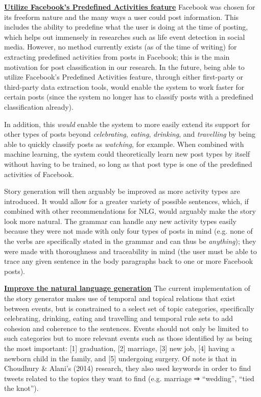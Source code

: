 \underline{\textbf{Utilize Facebook's Predefined Activities feature}}
Facebook was chosen for its freeform nature and the many ways a user could post information. This includes the ability to predefine what the user is doing at the time of posting, which helps out immensely in researches such as life event detection in social media. However, no method currently exists (as of the time of writing) for extracting predefined activities from posts in Facebook; this is the main motivation for post classification in our research. In the future, being able to utilize Facebook’s Predefined Activities feature, through either first-party or third-party data extraction tools, would enable the system to work faster for certain posts (since the system no longer has to classify posts with a predefined classification already). 

In addition, this \textit{would} enable the system to more easily extend its support for other types of posts beyond \textit{celebrating}, \textit{eating}, \textit{drinking}, and \textit{travelling} by being able to quickly classify posts as \textit{watching}, for example. When combined with machine learning, the system could theoretically learn new post types by itself without having to be trained, so long as that post type is one of the predefined activities of Facebook.

Story generation will then arguably be improved as more activity types are introduced. It would allow for a greater variety of possible sentences, which, if combined with other recommendations for NLG, would arguably make the story look more natural. The grammar can handle any new activity types easily because they were not made with only four types of posts in mind (e.g. none of the verbs are specifically stated in the grammar and can thus be \textit{anything}); they were made with thoroughness and traceability in mind (the user must be able to trace any given sentence in the body paragraphs back to one or more Facebook posts).

\underline{\textbf{Improve the natural language generation}}
The current implementation of the story generator makes use of temporal and topical relations that exist between events, but is constrained to a select set of topic categories, specifically celebrating, drinking, eating and travelling and temporal rule sets to add cohesion and coherence to the sentences. Events should not only be limited to such categories but to more relevant events such as those identified by \cite{conf/ht/ChoudhuryA14} as being the most important: [1] graduation, [2] marriage, [3] new job, [4] having a newborn child in the family, and [5] undergoing surgery. Of note is that in Choudhury \& Alani’s (2014) research, they also used keywords in order to find tweets related to the topics they want to find (e.g. marriage ⇒ ``wedding”, ``tied the knot”).

